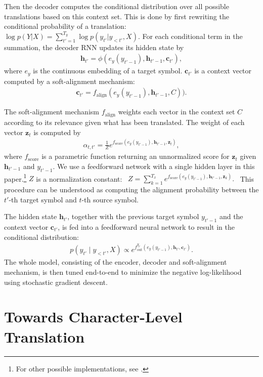 \documentclass[11pt]{article}
\newcommand{\vect}[1]{\mathbf{#1}}
\newcommand{\vc}[0]{\vect{c}}
\newcommand{\vh}[0]{\vect{h}}
\newcommand{\vz}[0]{\vect{z}}
\begin{document}
Then the decoder computes the conditional distribution over all possible
translations based on this context set. This is done by first rewriting the
conditional probability of a translation:
$
    \log p(Y|X) = \sum_{t'=1}^{T_y} \log p(y_{t'} | y_{<t'},
    X).
$
For each conditional term in the summation, the decoder RNN updates its hidden
state by
\begin{align}
    \label{eq:dec_state}
    \vh_{t'} = \phi(e_y(y_{t'-1}), \vh_{t'-1}, \vc_{t'}),
\end{align}
where $e_y$ is the continuous embedding of a target symbol. $\vc_{t'}$ is a
context vector computed by a soft-alignment mechanism:
\begin{align}
    \label{eq:att_context}
    \vc_{t'} = f_{\mathrm{align}}(e_y(y_{t'-1}), \vh_{t'-1}, C)).
\end{align}

The soft-alignment mechanism $f_{\mathrm{align}}$ weights each vector in the
context set $C$
according to its relevance given
what has been translated. 
The weight of each vector $\vz_t$ is computed by
\begin{align}
    \label{eq:att}
    \alpha_{t, t'} = \frac{1}{Z}e^{f_{\mathrm{score}} (e_y(y_{t'-1}), \vh_{t'-1}, \vz_t)},
\end{align}
where $f_{\mathrm{score}}$ is a parametric function returning an unnormalized
score for $\vz_t$ given $\vh_{t'-1}$ and $y_{t'-1}$. We use a feedforward
network with a single hidden layer in this paper.\footnote{
    {\scriptsize For other possible implementations, see \cite{luong2015effective}.}
} $Z$ is a normalization constant:
\mbox{
$
    Z = \sum_{k=1}^{T_x} e^{f_{\mathrm{score}} (e_y(y_{t'-1}), \vh_{t'-1}, \vz_k)}.
$
}
This procedure can be understood as computing the alignment probability between
the $t'$-th target symbol and $t$-th source symbol.

The hidden state $\vh_{t'}$, together with the previous target symbol $y_{t'-1}$
and the context vector $\vc_{t'}$, is fed into a feedforward neural network to
result in the conditional distribution:
\begin{align}
    \label{eq:output}
    p(y_{t'}\mid y_{<t'}, X) \propto
    e^{f^{y_{t'}}_{\mathrm{out}}(e_y(y_{t'-1}), \vh_{t'}, \vc_{t'})}.
\end{align}
The whole model, consisting of the encoder, decoder and soft-alignment
mechanism, is then tuned end-to-end to minimize the negative log-likelihood using stochastic gradient descent.

\section{Towards Character-Level Translation}
\label{sec:motivation}
\end{document}
